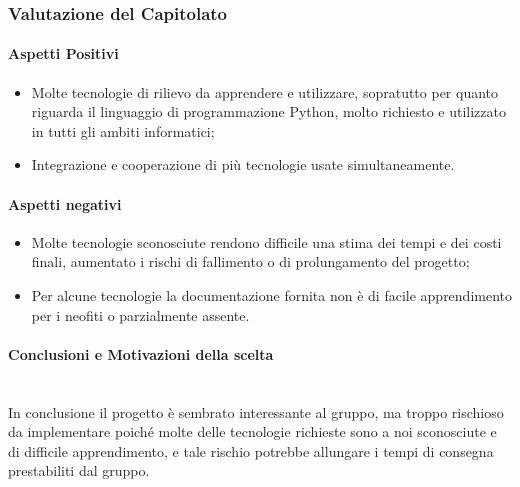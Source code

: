 \subsubsection{Valutazione del Capitolato}

\paragraph{Aspetti Positivi}
\begin{itemize}
	\item Molte tecnologie di rilievo da apprendere e utilizzare, sopratutto per quanto riguarda il linguaggio di programmazione Python, molto richiesto e utilizzato in tutti gli ambiti informatici;
	\item Integrazione e cooperazione di più tecnologie usate simultaneamente. 
\end{itemize}

\paragraph{Aspetti negativi}
\begin{itemize}
	\item Molte tecnologie sconosciute rendono difficile una stima dei tempi e dei costi finali, aumentato i rischi di fallimento o di prolungamento del progetto; 
	\item Per alcune tecnologie la documentazione fornita non è di facile apprendimento per i neofiti o parzialmente assente. 
\end{itemize}


\paragraph{Conclusioni e Motivazioni della scelta}\-\\
In conclusione il progetto è sembrato interessante al gruppo, ma troppo rischioso da implementare poiché molte delle tecnologie richieste sono a noi sconosciute e di difficile apprendimento, e tale rischio potrebbe allungare i tempi di consegna prestabiliti dal gruppo.  

